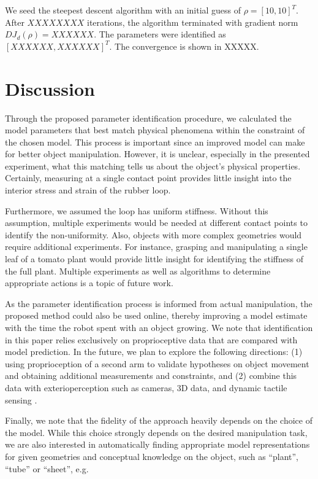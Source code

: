 \documentclass[letterpaper, 10pt, conference]{ieeeconf}
\begin{document}
We seed the steepest descent algorithm with an initial guess of $\rho = [10, 10]^T$.  After $XXXXXXXX$ iterations, the algorithm terminated with gradient norm $DJ_d(\rho) = XXXXXX$.  The parameters were identified as $[XXXXXX,XXXXXX]^T$.  The convergence is shown in XXXXX.%

\section{Discussion}
Through the proposed parameter identification procedure, we calculated the model parameters that best match physical phenomena within the constraint of the chosen model.  This process is important since an improved model can make for better object manipulation.  However, it is unclear, especially in the presented experiment, what this matching tells us about the object's physical properties.  Certainly, measuring at a single contact point provides little insight into the interior stress and strain of the rubber loop.

Furthermore, we assumed the loop has uniform stiffness.  Without this assumption, multiple experiments would be needed at different contact points to identify the non-uniformity.  Also, objects with more complex geometries would require additional experiments.  For instance, grasping and manipulating a single leaf of a tomato plant would provide little insight for identifying the stiffness of the full plant.  Multiple experiments as well as algorithms to determine appropriate actions is a topic of future work.

As the parameter identification process is informed from actual manipulation, the proposed method could also be used online, thereby improving a model estimate with the time the robot spent with an object growing. We note that identification in this paper relies exclusively on proprioceptive data that are compared with model prediction. In the future, we plan to explore the following directions: (1) using proprioception of a second arm to validate hypotheses on object movement and obtaining additional measurements and constraints, and (2) combine this data with exterioperception such as cameras, 3D data, and dynamic tactile sensing \cite{hughes2014}. 

Finally, we note that the fidelity of the approach heavily depends on the choice of the model. While this choice strongly depends on the desired manipulation task, we are also interested in automatically finding appropriate model representations for given geometries and conceptual knowledge on the object, such as ``plant'', ``tube'' or ``sheet'', e.g.  
\end{document}

